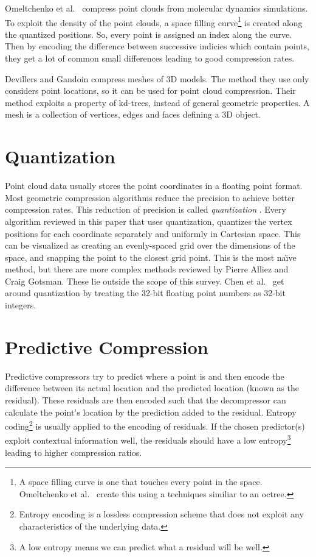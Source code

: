 \documentclass{report}
\begin{document}
Omeltchenko et al.~\cite{omeltchenko2000sls} compress point clouds from
molecular dynamics simulations. To exploit the density of the point clouds, a
space filling curve\footnote{A space filling curve is one that touches every
  point in the space. Omeltchenko et al.~\cite{omeltchenko2000sls} create this
  using a techniques similiar to an octree.} is created along the quantized
positions. So, every point is assigned an index along the curve. Then by
encoding the difference between successive indicies which contain points, they
get a lot of common small differences leading to good compression rates.

Devillers and Gandoin \cite{devillers2000gci} compress meshes of 3D
models. The method they use only considers point locations, so it can be used
for point cloud compression. Their method exploits a property of kd-trees,
instead of general geometric properties. A mesh is a collection of vertices,
edges and faces defining a 3D object.


\section{Quantization}

Point cloud data usually stores the point coordinates in a floating point
format. Most geometric compression algorithms reduce the precision to achieve
better compression rates. This reduction of precision is called
\emph{quantization} \cite{ag-racm-03}. Every algorithm reviewed in this paper
that uses quantization, quantizes the vertex positions for each coordinate
separately and uniformly in Cartesian space. This can be visualized as
creating an evenly-spaced grid over the dimensions of the space, and snapping
the point to the closest grid point. This is the most na\"{\i}ve method, but
there are more complex methods reviewed by Pierre Alliez and Craig
Gotsman\cite{ag-racm-03}. These lie outside the scope of this survey. Chen et
al.~\cite{chen2005lcp} get around quantization by treating the 32-bit floating
point numbers as 32-bit integers.


\section{Predictive Compression}

Predictive compressors try to predict where a point is and then encode the
difference between its actual location and the predicted location (known as
the residual). These residuals are then encoded such that the decompressor can
calculate the point's location by the prediction added to the
residual. Entropy coding\footnote{Entropy encoding is a lossless compression
  scheme that does not exploit any characteristics of the underlying data.} is
usually applied to the encoding of residuals. If the chosen predictor(s)
exploit contextual information well, the residuals should have a low
entropy\footnote{A low entropy means we can predict what a residual will be
  well.}  leading to higher compression ratios.
\end{document}
